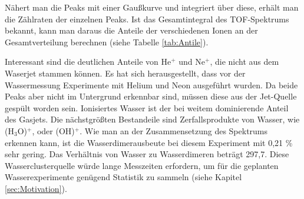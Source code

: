 Nähert man die Peaks mit einer Gaußkurve und integriert über diese, erhält man die Zählraten der einzelnen Peaks. Ist das Gesamtintegral des TOF-Spektrums bekannt, kann man daraus die Anteile der verschiedenen Ionen an der Gesamtverteilung berechnen (siehe Tabelle \ref{tab:Antile}).
%
\begin{center}
\begin{table}[H]
 \caption{Auswertung der Ionenanteile aus Abbildung \ref{fig:TOFJet}. Die Zeile \enquote{Untergrund} fasst schwach ausgeprägte und/oder sehr breite Peaks (N$^+$, O$^+$, O$_2^+$ etc.) zusammen.} \label{tab:Antile}
\end{table}
\end{center} 

Interessant sind die deutlichen Anteile von He$^+$ und Ne$^+$, die nicht aus dem Waserjet stammen können. Es hat sich herausgestellt, dass vor der Wassermessung Experimente mit Helium und Neon ausgeführt wurden. Da beide Peaks aber nicht im Untergrund erkennbar sind, müssen diese aus der Jet-Quelle gespült worden sein. Ionisiertes Wasser ist der bei weitem dominierende Anteil des Gasjets. Die nächstgrößten Bestandeile sind Zerfallsprodukte von Wasser, wie (H$_3$O)$^+$, oder (OH)$^+$. Wie man an der Zusammensetzung des Spektrums erkennen kann, ist die Wasserdimerausbeute bei diesem Experiment mit 0,21 \% sehr gering. Das Verhältnis von Wasser zu Wasserdimeren beträgt 297,7. Diese Wasserclusterquelle würde lange Messzeiten erfordern, um für die geplanten Wasserexperimente genügend Statistik zu sammeln (siehe Kapitel \ref{sec:Motivation}).

